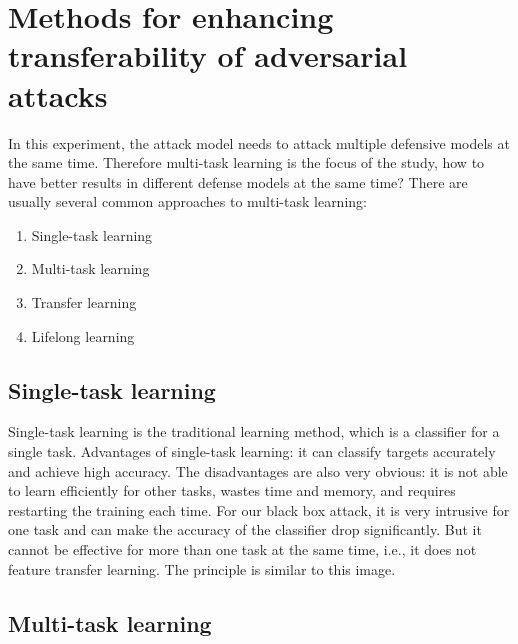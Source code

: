 \section{Methods for enhancing transferability of adversarial attacks}

In this experiment, the attack model needs to attack multiple defensive models at the same time. Therefore multi-task learning is the focus of the study, how to have better results in different defense models at the same time?
There are usually several common approaches to multi-task learning:
\begin{enumerate}[\qquad  1.]
	\item Single-task learning
	\item Multi-task learning
	\item Transfer learning
	\item Lifelong learning
\end{enumerate}

\subsection{Single-task learning}

Single-task learning is the traditional learning method, which is a classifier for a single task. Advantages of single-task learning: it can classify targets accurately and achieve high accuracy. The disadvantages are also very obvious: it is not able to learn efficiently for other tasks, wastes time and memory, and requires restarting the training each time.
For our black box attack, it is very intrusive for one task and can make the accuracy of the classifier drop significantly. But it cannot be effective for more than one task at the same time, i.e., it does not feature transfer learning. The principle is similar to this image.

\subsection{Multi-task learning}

